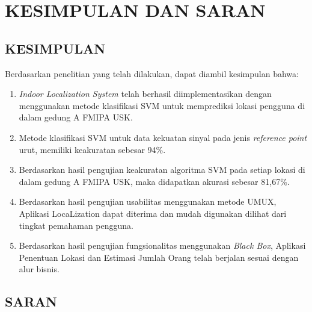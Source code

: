 \fancyhf{}
\fancyfoot[C]{\thepage}
\chapter{KESIMPULAN DAN SARAN}

\section{\uppercase{KESIMPULAN}}
Berdasarkan penelitian yang telah dilakukan, dapat diambil kesimpulan bahwa:
\begin{enumerate}
	\item \textit{Indoor Localization System} telah berhasil diimplementasikan dengan menggunakan metode klasifikasi SVM untuk memprediksi lokasi pengguna di dalam gedung A FMIPA USK.
	\item Metode klasifikasi SVM untuk data kekuatan sinyal pada jenis \textit{reference point} urut, memiliki keakuratan sebesar 94\%.
	\item Berdasarkan hasil pengujian keakuratan algoritma SVM pada setiap lokasi di dalam gedung A FMIPA USK, maka didapatkan  akurasi sebesar 81,67\%.
	\item Berdasarkan hasil pengujian usabilitas menggunakan metode UMUX, Aplikasi LocaLization dapat diterima dan mudah digunakan dilihat dari tingkat pemahaman pengguna.
	\item Berdasarkan hasil pengujian fungsionalitas menggunakan \textit{Black Box}, Aplikasi Penentuan Lokasi dan Estimasi Jumlah Orang telah berjalan sesuai dengan alur bisnis.
\end{enumerate}



\section{\uppercase{SARAN}}

